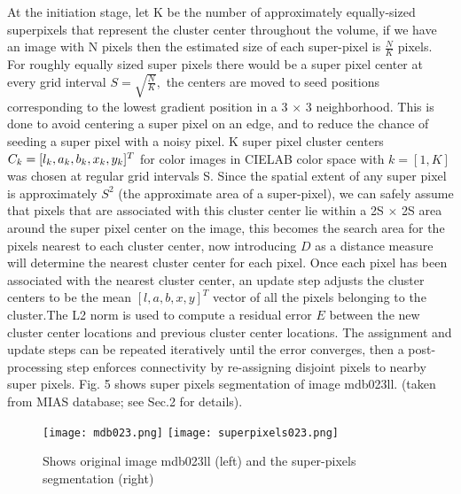 \documentclass{article}
\begin{document}
{At the initiation stage, let K be the number of approximately equally-sized superpixels that represent the cluster center throughout the volume, if we have an image with N pixels then the estimated size of each super-pixel is $\frac{N}{K}$ pixels. For roughly equally sized super pixels there would be a super pixel center at every grid interval $S =\sqrt{\frac{N}{K}},$ the centers are moved to seed positions corresponding to the lowest gradient position in a 3 $\times$ 3 neighborhood.
This is done to avoid centering a super pixel on an edge, and to reduce the chance of seeding a super pixel with a noisy pixel. K super pixel cluster centers ${\large C}_{k} = [{\large }l_{k}, {\large }a_{k},{\large }b_{k},{\large }x_{k},{\large }y_{k}]^{T}$ for color images in CIELAB color space with $k = [1, K]$ was chosen at regular grid intervals S. Since the spatial extent of any super pixel is approximately $S^2$ (the approximate area of a super-pixel), we can safely assume that pixels that are associated with this cluster center lie within a 2S $\times$ 2S area around the super pixel center on the image, this becomes the search area for the pixels nearest to each cluster center, now introducing $D$ as a distance measure will determine the nearest cluster center for each pixel. Once each pixel has been associated with the nearest cluster center, an update step adjusts the cluster centers to be the mean $[l, a, b, x, y]^T$ vector of all the pixels belonging to the cluster.The L2 norm is used to compute a residual error $E$ between the new cluster center locations and previous cluster center locations. The assignment and update steps can be repeated iteratively until the error converges, then a post-processing step enforces connectivity by re-assigning disjoint pixels to nearby super pixels. Fig. 5 shows super pixels segmentation of  image mdb023ll. (taken from MIAS database; see Sec.2 for details).	
 \begin{figure}[!htb]
 	\centering
 	\texttt{[image: mdb023.png]}\hfil
 	\texttt{[image: superpixels023.png]}
 	\caption{Shows original image mdb023ll (left) and the super-pixels segmentation (right)}
 	\label{fig:mdb023}
 \end{figure}

 	 	 	 
}
\end{document}
